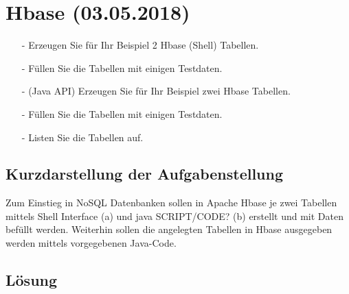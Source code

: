 \section{Hbase (03.05.2018)}
\begin{itemize}
\item[-] Erzeugen Sie für Ihr Beispiel 2 Hbase (Shell) Tabellen.
\item[-] Füllen Sie die Tabellen mit einigen Testdaten.
\item[-] (Java API) Erzeugen Sie für Ihr Beispiel zwei Hbase Tabellen.
\item[-] Füllen Sie die Tabellen mit einigen Testdaten.
\item[-] Listen Sie die Tabellen auf.
\end{itemize}
\subsection*{Kurzdarstellung der Aufgabenstellung}
Zum Einstieg in NoSQL Datenbanken sollen in Apache Hbase je zwei Tabellen mittels Shell Interface (a) und java SCRIPT/CODE? (b) erstellt und mit Daten befüllt werden. Weiterhin sollen die angelegten Tabellen in Hbase ausgegeben werden mittels vorgegebenen Java-Code.
\subsection*{Lösung}


